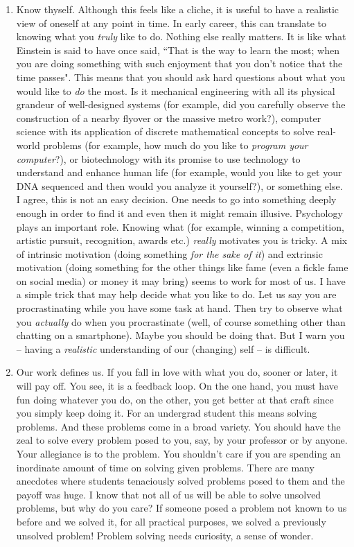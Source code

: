 \documentclass[a6paper]{article}
\begin{document}
\begin{enumerate}
    \item Know thyself. Although this feels like a cliche, it is useful to have a realistic view of oneself at any point in time. In early career, this can translate to knowing what you \emph{truly} like to do. Nothing else really matters. It is like what Einstein is said to have once said, ``That is the way to learn the most; when you are doing something with such enjoyment that you don't notice that the time passes". This means that you should ask hard questions about what you would like to \emph{do} the most. Is it mechanical engineering with all its physical grandeur of well-designed systems (for example, did you carefully observe the construction of a nearby flyover or the massive metro work?), computer science with its application of discrete mathematical concepts to solve real-world problems (for example, how much do you like to \emph{program your computer}?), or biotechnology with its promise to use technology to understand and enhance human life (for example, would you like to get your DNA sequenced and then would you analyze it yourself?), or something else. I agree, this is not an easy decision. One needs to go into something deeply enough in order to find it and even then it might remain illusive. Psychology plays an important role. Knowing what (for example, winning a competition, artistic pursuit, recognition, awards etc.) \emph{really} motivates you is tricky. A mix of intrinsic motivation (doing something \emph{for the sake of it}) and extrinsic motivation (doing something for the other things like fame (even a fickle fame on social media) or money it may bring) seems to work for most of us. I have a simple trick that may help decide what you like to do. Let us say you are procrastinating while you have some task at hand. Then try to observe what you \emph{actually} do when you procrastinate (well, of course something other than chatting on a smartphone). Maybe you should be doing that. But I warn you -- having a \emph{realistic} understanding of our (changing) self -- is difficult. 
    \item Our work defines us. If you fall in love with what you do, sooner or later, it will pay off. You see, it is a feedback loop. On the one hand, you must have fun doing whatever you do, on the other, you get better at that craft since you simply keep doing it. For an undergrad student this means solving problems. And these problems come in a broad variety. You should have the zeal to solve every problem posed to you, say, by your professor or by anyone. Your allegiance is to the problem. You shouldn't care if you are spending an inordinate amount of time on solving given problems. There are many anecdotes where students tenaciously solved problems posed to them and the payoff was huge. I know that not all of us will be able to solve unsolved problems, but why do you care? If someone posed a problem not known to us before and we solved it, for all practical purposes, we solved a previously unsolved problem! Problem solving needs curiosity, a sense of wonder.

\end{enumerate}
\end{document}

